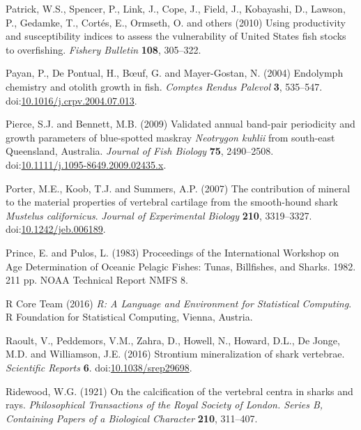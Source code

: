 \documentclass[]{article}
\begin{document}
\hypertarget{ref-patrick_using_2010}{}
Patrick, W.S., Spencer, P., Link, J., Cope, J., Field, J., Kobayashi,
D., Lawson, P., Gedamke, T., Cortés, E., Ormseth, O. and others (2010)
Using productivity and susceptibility indices to assess the
vulnerability of United States fish stocks to overfishing. \emph{Fishery
Bulletin} \textbf{108}, 305--322.

\hypertarget{ref-payan_endolymph_2004}{}
Payan, P., De Pontual, H., Bœuf, G. and Mayer-Gostan, N. (2004)
Endolymph chemistry and otolith growth in fish. \emph{Comptes Rendus
Palevol} \textbf{3}, 535--547.
doi:\href{https://doi.org/10.1016/j.crpv.2004.07.013}{10.1016/j.crpv.2004.07.013}.

\hypertarget{ref-pierce_validated_2009}{}
Pierce, S.J. and Bennett, M.B. (2009) Validated annual band-pair
periodicity and growth parameters of blue-spotted maskray
\emph{Neotrygon kuhlii} from south-east Queensland, Australia.
\emph{Journal of Fish Biology} \textbf{75}, 2490--2508.
doi:\href{https://doi.org/10.1111/j.1095-8649.2009.02435.x}{10.1111/j.1095-8649.2009.02435.x}.

\hypertarget{ref-porter_contribution_2007}{}
Porter, M.E., Koob, T.J. and Summers, A.P. (2007) The contribution of
mineral to the material properties of vertebral cartilage from the
smooth-hound shark \emph{Mustelus californicus}. \emph{Journal of
Experimental Biology} \textbf{210}, 3319--3327.
doi:\href{https://doi.org/10.1242/jeb.006189}{10.1242/jeb.006189}.

\hypertarget{ref-prince_proceedings_1983}{}
Prince, E. and Pulos, L. (1983) Proceedings of the International
Workshop on Age Determination of Oceanic Pelagic Fishes: Tunas,
Billfishes, and Sharks. 1982. 211 pp. NOAA Technical Report NMFS 8.

\hypertarget{ref-r_core_team_r:_2016}{}
R Core Team (2016) \emph{R: A Language and Environment for Statistical
Computing}. R Foundation for Statistical Computing, Vienna, Austria.

\hypertarget{ref-raoult_strontium_2016}{}
Raoult, V., Peddemors, V.M., Zahra, D., Howell, N., Howard, D.L., De
Jonge, M.D. and Williamson, J.E. (2016) Strontium mineralization of
shark vertebrae. \emph{Scientific Reports} \textbf{6}.
doi:\href{https://doi.org/10.1038/srep29698}{10.1038/srep29698}.

\hypertarget{ref-ridewood_calcification_1921}{}
Ridewood, W.G. (1921) On the calcification of the vertebral centra in
sharks and rays. \emph{Philosophical Transactions of the Royal Society
of London. Series B, Containing Papers of a Biological Character}
\textbf{210}, 311--407.
\end{document}
